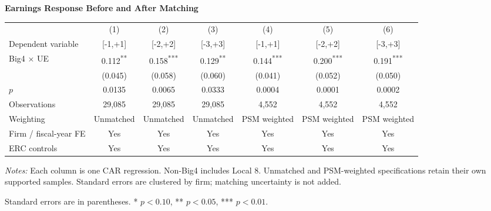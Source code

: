 \documentclass[10pt]{article}
\newcommand{\sym}[1]{\textsuperscript{#1}}
\begin{document}
\begin{minipage}{23.60cm}
\fontsize{10}{12}\selectfont
\setlength{\tabcolsep}{4pt}\renewcommand{\arraystretch}{1.08}
{\large\bfseries Earnings Response Before and After Matching}\par\medskip
\begin{tabular*}{\linewidth}{@{\extracolsep{\fill}}lcccccc@{}}
\toprule
 & (1) & (2) & (3) & (4) & (5) & (6) \\
Dependent variable & [-1,+1] & [-2,+2] & [-3,+3] & [-1,+1] & [-2,+2] & [-3,+3] \\
\midrule
Big4 $\times$ UE & 0.112\sym{**} & 0.158\sym{***} & 0.129\sym{**} & 0.144\sym{***} & 0.200\sym{***} & 0.191\sym{***} \\
 & (0.045) & (0.058) & (0.060) & (0.041) & (0.052) & (0.050) \\
$p$ & 0.0135 & 0.0065 & 0.0333 & 0.0004 & 0.0001 & 0.0002 \\
\midrule
Observations & 29,085 & 29,085 & 29,085 & 4,552 & 4,552 & 4,552 \\
Weighting & Unmatched & Unmatched & Unmatched & PSM weighted & PSM weighted & PSM weighted \\
Firm / fiscal-year FE & Yes & Yes & Yes & Yes & Yes & Yes \\
ERC controls & Yes & Yes & Yes & Yes & Yes & Yes \\
\bottomrule\end{tabular*}\par\medskip
\fontsize{9}{11}\selectfont\textit{Notes:} Each column is one CAR regression. Non-Big4 includes Local 8. Unmatched and PSM-weighted specifications retain their own supported samples. Standard errors are clustered by firm; matching uncertainty is not added.
\par Standard errors are in parentheses. * $p<0.10$, ** $p<0.05$, *** $p<0.01$.
\end{minipage}
\end{document}

